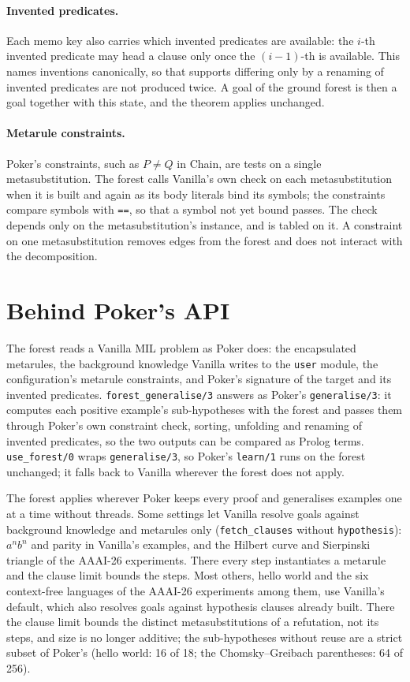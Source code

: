 \documentclass[11pt]{article}
\begin{document}
\paragraph{Invented predicates.} Each memo key also carries which invented predicates
are available: the $i$-th invented predicate may head a clause only once the
$(i{-}1)$-th is available. This names inventions canonically, so that supports
differing only by a renaming of invented predicates are not produced twice. A goal
of the ground forest is then a goal together with this state, and the theorem
applies unchanged.

\paragraph{Metarule constraints.} Poker's constraints, such as $P \neq Q$ in Chain,
are tests on a single metasubstitution. The forest calls Vanilla's own check on
each metasubstitution when it is built and again as its body literals bind its
symbols; the constraints compare symbols with \texttt{==}, so that a symbol not yet
bound passes. The check depends only on the metasubstitution's instance, and is
tabled on it. A constraint on one metasubstitution removes edges from the forest and
does not interact with the decomposition.

\section{Behind Poker's API}\label{sec:poker}

The forest reads a Vanilla MIL problem as Poker does: the encapsulated metarules,
the background knowledge Vanilla writes to the \texttt{user} module, the
configuration's metarule constraints, and Poker's signature of the target and its
invented predicates. \nolinkurl{forest_generalise/3} answers as Poker's
\nolinkurl{generalise/3}: it computes each positive example's sub-hypotheses with the
forest and passes them through Poker's own constraint check, sorting, unfolding and
renaming of invented predicates, so the two outputs can be compared as Prolog terms.
\nolinkurl{use_forest/0} wraps \nolinkurl{generalise/3}, so Poker's \nolinkurl{learn/1} runs
on the forest unchanged; it falls back to Vanilla wherever the forest does not
apply.

The forest applies wherever Poker keeps every proof and generalises examples one at
a time without threads. Some settings let Vanilla resolve goals against background
knowledge and metarules only (\texttt{fetch\_clauses} without \texttt{hypothesis}):
$a^nb^n$ and parity in Vanilla's examples, and the Hilbert curve and Sierpinski
triangle of the AAAI-26 experiments. There every step instantiates a metarule and
the clause limit bounds the steps. Most others, hello world and the six context-free
languages of the AAAI-26 experiments among them, use Vanilla's default, which also
resolves goals against hypothesis clauses already built. There the clause limit
bounds the distinct metasubstitutions of a refutation, not its steps, and size is no
longer additive; the sub-hypotheses without reuse are a strict subset of Poker's
(hello world: 16 of 18; the Chomsky--Greibach parentheses: 64 of 256).
\end{document}
